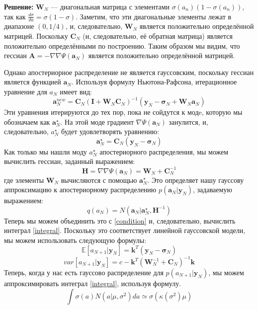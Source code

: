 {\textbf{Решение:}
$\mathbf{W}_{N}$ — диагональная матрица с элементами $\sigma(a_n)(1-\sigma(a_n))$, так как $\frac{d\sigma}{da}=\sigma(1-\sigma)$. Заметим, что эти диагональные элементы лежат в диапазоне $(0, 1/4)$, и, следовательно, $\mathbf{W}_{N}$ является положительно определённой матрицей. Поскольку $\mathbf{C}_N$ (и, следовательно, её обратная матрица) является положительно определёнными по построению. Таким образом мы видим, что гессиан $\mathbf{A}=-\nabla \nabla \Psi(\mathbf{a}_N)$ является положительно определённой матрицей.


Однако апостериорное распределение не является гауссовским, поскольку гессиан является функцией $\mathbf{a}_N$.
Используя формулу Ньютона-Рафсона, итерационное уравнение для $a_N$ имеет вид:
\[
\mathbf{a}_N^{new} = \mathbf{C}_N(\mathbf{I} + \mathbf{W}_N\mathbf{C}_N)^{-1}(\mathbf{y}_N-\mathbf{\sigma}_N+\mathbf{W}_N\mathbf{a}_N) 
\]
Эти уравнения итерируются до тех пор, пока не сойдутся к модe, которую мы обозначаем как $\mathbf{a}_N^{\star}$. На этой моде градиент $\nabla \Psi(\mathbf{a}_N)$ занулится, и, следовательно, $a_N^{\star}$ будет удовлетворять уравнению:
\begin{equation}
\label{star}
\mathbf{a}_N^{\star} = \mathbf{C}_N(\mathbf{y}_N - \mathbf{\sigma}_N) 
\end{equation}
Как только мы нашли моду $a_N^{\star}$ апостериорного распределения, мы можем вычислить гессиан, заданный выражением:
\[
\mathbf{H} = \nabla \nabla \Psi(\mathbf{a}_N) = \mathbf{W}_N+\mathbf{C}_N^{-1} 
\]
где элементы $\mathbf{W}_N$ вычисляются с помощью $\mathbf{a}_N^{\star}$. Это определяет нашу гауссову аппроксимацию к апостериорному распределению $p(\mathbf{a}_N|\mathbf{y}_N)$, задаваемую выражением:
\[
q(a_N) = N(\mathbf{a}_N|\mathbf{a}_N^{\star}, \mathbf{H}^{-1}) 
\]
Теперь мы можем объединить это с \ref{condition} и, следовательно, вычислить интеграл \ref{integral}. Поскольку это соответствует линейной гауссовской модели, мы можем использовать следующую формулы:
\[
\mathbb{E}[a_{N+1}|\mathbf{y}_N] =\mathbf{k}^T(\mathbf{y}_N - \mathbf{\sigma}_N) 
\]
\[
var[a_{N+1}|\mathbf{y}_N] = c-\mathbf{k}^T(\mathbf{W}_N^{-1} + \mathbf{C}_N)^{-1}\mathbf{k} 
\]
Теперь, когда у нас есть гауссово распределение для $p(a_{N+1}|\mathbf{y}_{N})$, мы можем аппроксимировать интеграл \ref{integral}, используя формулу.
\[
\int \sigma(a)N(a|\mu,\sigma^{2})da\simeq \sigma(\kappa(\sigma^{2})\mu)
\]

}
